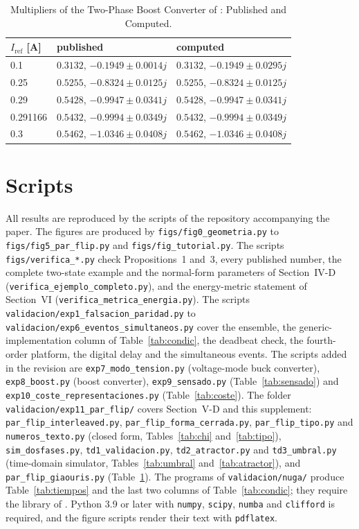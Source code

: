 \documentclass[journal]{IEEEtran}
\begin{document}
\begin{table}[!h]
\caption{Multipliers of the Two-Phase Boost Converter of
\cite{giaouris2013foldings}: Published and Computed.}
\label{tab:giaouris}
\centering
\footnotesize
\setlength{\tabcolsep}{4pt}
\begin{tabular}{@{}lll@{}}
\toprule
$I_{\mathrm{ref}}$ [A] & published & computed \\
\midrule
0.1 & $0.3132$, $-0.1949\pm0.0014j$ & $0.3132$, $-0.1949\pm0.0295j$ \\
0.25 & $0.5255$, $-0.8324\pm0.0125j$ & $0.5255$, $-0.8324\pm0.0125j$ \\
0.29 & $0.5428$, $-0.9947\pm0.0341j$ & $0.5428$, $-0.9947\pm0.0341j$ \\
0.291166 & $0.5432$, $-0.9994\pm0.0349j$ & $0.5432$, $-0.9994\pm0.0349j$ \\
0.3 & $0.5462$, $-1.0346\pm0.0408j$ & $0.5462$, $-1.0346\pm0.0408j$ \\
\bottomrule
\end{tabular}
\end{table}

\section{Scripts}
All results are reproduced by the scripts of the repository accompanying the
paper. The figures are produced by \texttt{figs/fig0\_geometria.py} to
\texttt{figs/fig5\_par\_flip.py} and \texttt{figs/fig\_tutorial.py}.
The scripts \texttt{figs/verifica\_*.py} check Propositions~1 and~3, every
published number, the complete two-state example and the normal-form
parameters of Section~IV-D
(\texttt{verifica\_ejemplo\_completo.py}), and the energy-metric statement of
Section~VI (\texttt{verifica\_metrica\_energia.py}). The scripts
\texttt{validacion/exp1\_falsacion\_paridad.py} to
\texttt{validacion/exp6\_eventos\_simultaneos.py} cover the ensemble, the
generic-implementation column of Table~\ref{tab:condic}, the deadbeat check,
the fourth-order platform, the digital delay and the simultaneous events.
The scripts added in the revision are \texttt{exp7\_modo\_tension.py}
(voltage-mode buck converter), \texttt{exp8\_boost.py} (boost converter),
\texttt{exp9\_sensado.py} (Table~\ref{tab:sensado}) and
\texttt{exp10\_coste\_representaciones.py} (Table~\ref{tab:coste}). The
folder \texttt{validacion/exp11\_par\_flip/} covers Section~V-D and this
supplement: \texttt{par\_flip\_interleaved.py},
\texttt{par\_flip\_forma\_cerrada.py}, \texttt{par\_flip\_tipo.py} and
\texttt{numeros\_texto.py} (closed form, Tables~\ref{tab:chi}
and~\ref{tab:tipo}), \texttt{sim\_dosfases.py},
\texttt{td1\_validacion.py}, \texttt{td2\_atractor.py} and
\texttt{td3\_umbral.py} (time-domain simulator,
Tables~\ref{tab:umbral} and~\ref{tab:atractor}), and
\texttt{par\_flip\_giaouris.py} (Table~\ref{tab:giaouris}). The
programs of \texttt{validacion/nuga/} produce Table~\ref{tab:tiempos} and
the last two columns of Table~\ref{tab:condic}; they require the library of
\cite{eid2025gafl}. Python 3.9 or later with \texttt{numpy}, \texttt{scipy},
\texttt{numba} and \texttt{clifford} is required, and the figure scripts
render their text with \texttt{pdflatex}.
\end{document}
